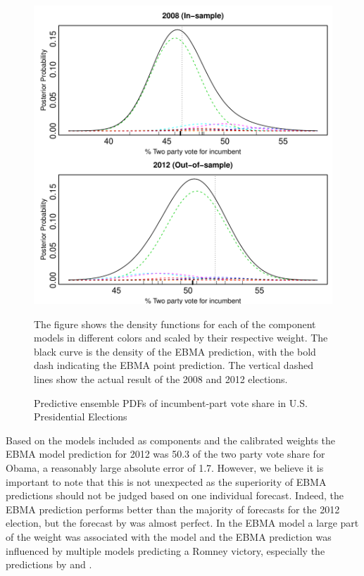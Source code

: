 \documentclass[12pt,fullpage,endnotes]{article}
\begin{document}
\begin{figure}[h]
\caption{Predictive ensemble PDFs of incumbent-part vote share in U.S. Presidential Elections}
\label{pres}
\begin{center}
\includegraphics[scale=.8]{presForecast}
\end{center}
The figure shows the density functions for each of the component
models in different colors and scaled by their respective weight. The black curve is the density of the EBMA
prediction, with the bold dash indicating the EBMA point
prediction. The vertical dashed lines show the actual result of the 2008 and 2012 elections.
\end{figure}

Based on the models included as components and the calibrated weights the EBMA model prediction for 2012 was 50.3 of the two party vote share for Obama, a reasonably large absolute error of 1.7. However, we believe it is important to note that this is not unexpected as the superiority of EBMA predictions should not be judged based on one individual forecast. Indeed, the EBMA prediction performs better than the majority of forecasts for the 2012 election, but the forecast by \citet{Campbell:2012} was almost perfect. In the EBMA model a large part of the weight was associated with the \citet{Abramowitz:2012} model and the EBMA prediction was influenced by multiple models predicting a Romney victory, especially the predictions by \citet{Hibbs:2012a} and \citet{LewisBeckTien:2012}. 
\end{document}
